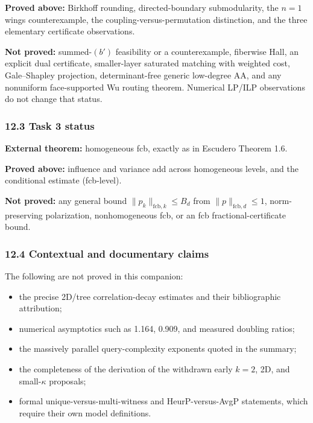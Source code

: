 \textbf{Proved above:} Birkhoff rounding, directed-boundary submodularity, the \(n=1\) wings counterexample, the coupling-versus-permutation distinction, and the three elementary certificate observations.

\textbf{Not proved:} summed-\((b')\) feasibility or a counterexample, fiberwise Hall, an explicit dual certificate, smaller-layer saturated matching with weighted cost, Gale--Shapley projection, determinant-free generic low-degree AA, and any nonuniform face-supported Wu routing theorem. Numerical LP/ILP observations do not change that status.

\subsubsection{12.3 Task 3 status}\label{task-3-status}

\textbf{External theorem:} homogeneous fcb, exactly as in Escudero Theorem 1.6.

\textbf{Proved above:} influence and variance add across homogeneous levels, and the conditional estimate (fcb-level).

\textbf{Not proved:} any general bound \(\|p_k\|_{\mathrm{fcb},k}\le B_d\) from \(\|p\|_{\mathrm{fcb},d}\le1\), norm-preserving polarization, nonhomogeneous fcb, or an fcb fractional-certificate bound.

\subsubsection{12.4 Contextual and documentary claims}\label{contextual-and-documentary-claims}

The following are not proved in this companion:

\begin{itemize}
\tightlist
\item
  the precise 2D/tree correlation-decay estimates and their bibliographic attribution;
\item
  numerical asymptotics such as 1.164, 0.909, and measured doubling ratios;
\item
  the massively parallel query-complexity exponents quoted in the summary;
\item
  the completeness of the derivation of the withdrawn early \(k=2\), 2D, and small-\(\kappa\) proposals;
\item
  formal unique-versus-multi-witness and HeurP-versus-AvgP statements, which require their own model definitions.
\end{itemize}

